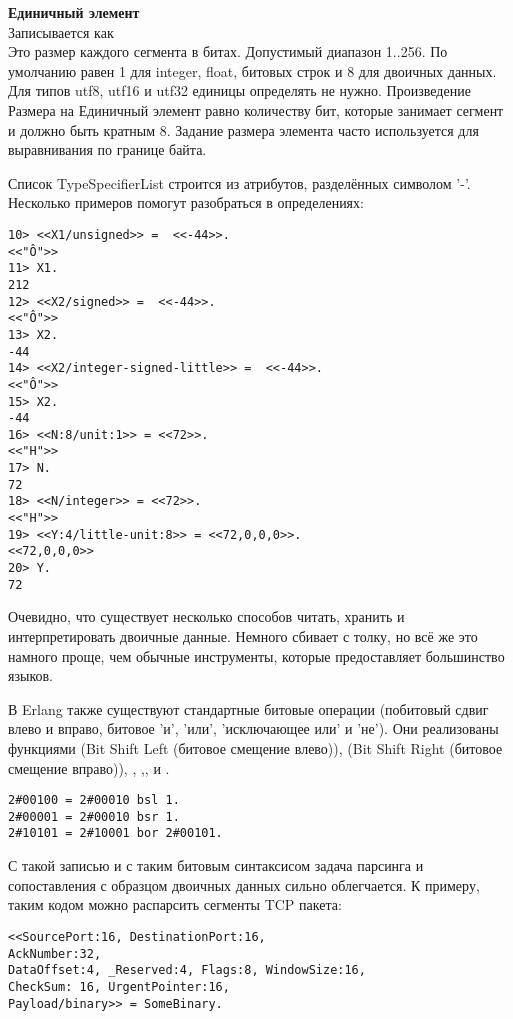 \begin{minipage}{\textwidth}
    \textbf{Единичный элемент}\\ 
    Записывается как \\ 
    Это размер каждого сегмента в битах.
    Допустимый диапазон 1..256. По умолчанию равен 1 для integer, float, битовых строк и 8 для двоичных данных.
    Для типов utf8, utf16 и utf32 единицы определять не нужно.
    Произведение Размера на Единичный элемент равно количеству бит, которые занимает сегмент и должно быть кратным 8.
    Задание размера элемента часто используется для выравнивания по границе байта.\\  
\end{minipage}

Список TypeSpecifierList строится из атрибутов, разделённых символом '\--'.\\ 

Несколько примеров помогут разобраться в определениях:
\begin{lstlisting}[style=repl]
10> <<X1/unsigned>> =  <<-44>>.
<<"Ô">>
11> X1.
212
12> <<X2/signed>> =  <<-44>>. 
<<"Ô">>
13> X2.
-44
14> <<X2/integer-signed-little>> =  <<-44>>.
<<"Ô">>
15> X2.
-44
16> <<N:8/unit:1>> = <<72>>.
<<"H">>
17> N.
72
18> <<N/integer>> = <<72>>.
<<"H">>
19> <<Y:4/little-unit:8>> = <<72,0,0,0>>.     
<<72,0,0,0>>
20> Y.
72
\end{lstlisting}

Очевидно, что существует несколько способов читать, хранить и интерпретировать двоичные данные.
Немного сбивает с толку, но всё же это намного проще, чем обычные инструменты, которые предоставляет большинство языков.

В Erlang также существуют стандартные битовые операции (побитовый сдвиг влево и вправо, битовое 'и', 'или', 'исключающее или' и 'не').
Они реализованы функциями  (Bit Shift Left (битовое смещение влево)),  (Bit Shift Right (битовое смещение вправо)), , ,, и .
\begin{lstlisting}[style=repl]
2#00100 = 2#00010 bsl 1.
2#00001 = 2#00010 bsr 1.
2#10101 = 2#10001 bor 2#00101.
\end{lstlisting}

С такой записью и с таким битовым синтаксисом задача парсинга и сопоставления с образцом двоичных данных сильно облегчается.
К примеру, таким кодом можно распарсить сегменты TCP пакета:
\begin{lstlisting}[style=repl]
<<SourcePort:16, DestinationPort:16,
AckNumber:32,
DataOffset:4, _Reserved:4, Flags:8, WindowSize:16,
CheckSum: 16, UrgentPointer:16,
Payload/binary>> = SomeBinary.
\end{lstlisting}

